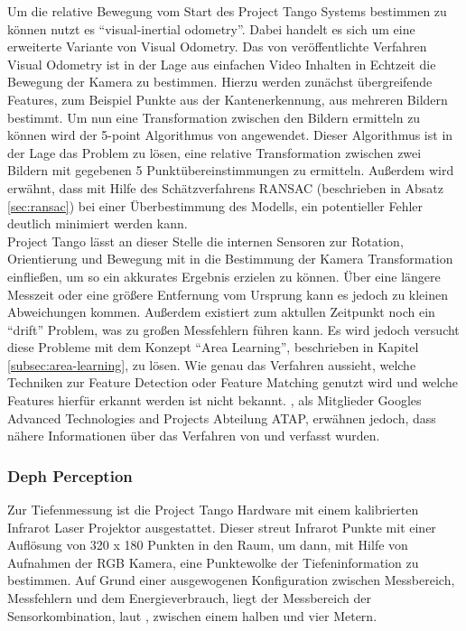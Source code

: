 Um die relative Bewegung vom Start des Project Tango Systems bestimmen zu können nutzt es \enquote{visual-inertial odometry}. \citep{GoogleDevelopersConcepts:online}
Dabei handelt es sich um eine erweiterte Variante von Visual Odometry. 
Das von \citet{nister2004visual} veröffentlichte Verfahren Visual Odometry ist in der Lage aus einfachen Video Inhalten in Echtzeit die Bewegung der Kamera zu bestimmen. 
Hierzu werden zunächst übergreifende Features, zum Beispiel Punkte aus der \citet{harris1988combined} Kantenerkennung, aus mehreren Bildern bestimmt. Um nun eine Transformation zwischen den Bildern ermitteln zu können wird der 5-point Algorithmus von \citet{nister2004efficient} angewendet. Dieser Algorithmus ist in der Lage das Problem zu lösen, eine relative Transformation zwischen zwei Bildern mit gegebenen 5 Punktübereinstimmungen zu ermitteln. Außerdem wird erwähnt, dass mit Hilfe des Schätzverfahrens RANSAC (beschrieben in Absatz \ref{sec:ransac}) bei einer Überbestimmung des Modells, ein potentieller Fehler deutlich minimiert werden kann. \\

Project Tango lässt an dieser Stelle die internen Sensoren zur Rotation, Orientierung und Bewegung mit in die Bestimmung der Kamera Transformation einfließen, um so ein akkurates Ergebnis erzielen zu können. Über eine längere Messzeit oder eine größere Entfernung vom Ursprung kann es jedoch zu kleinen Abweichungen kommen. Außerdem existiert zum aktullen Zeitpunkt noch ein \enquote{drift} Problem, was zu großen Messfehlern führen kann. Es wird jedoch versucht diese Probleme mit dem Konzept \enquote{Area Learning}, beschrieben in Kapitel \ref{subsec:area-learning}, zu lösen. \citep{GoogleDevelopersConcepts:online}
Wie genau das Verfahren aussieht, welche Techniken zur Feature Detection oder Feature Matching genutzt wird und welche Features hierfür erkannt werden ist nicht bekannt. \citet{Klingensmith_2015_7924}, als Mitglieder Googles Advanced Technologies and Projects Abteilung ATAP, erwähnen jedoch, dass nähere Informationen über das Verfahren von \citet{kottas2013consistency} und \citet{mourikis2007multi} verfasst wurden. \\

\subsubsection{Deph Perception}

Zur Tiefenmessung ist die Project Tango Hardware mit einem kalibrierten Infrarot Laser Projektor ausgestattet. Dieser streut Infrarot Punkte mit einer Auflösung von 320 x 180 Punkten in den Raum, um dann, mit Hilfe von Aufnahmen der RGB Kamera, eine Punktewolke der Tiefeninformation zu bestimmen. Auf Grund einer ausgewogenen Konfiguration zwischen Messbereich, Messfehlern und dem Energieverbrauch, liegt der Messbereich der Sensorkombination, laut \citet{GoogleDevelopersConcepts:online}, zwischen einem halben und vier Metern. \\

